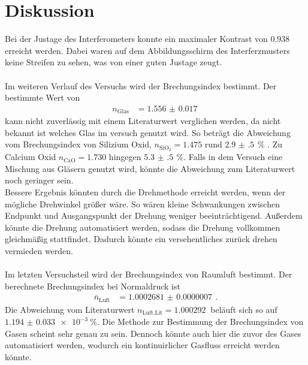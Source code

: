 \newpage
\section{Diskussion}
\label{sec:diskussion}
Bei der Justage des Interferometers konnte ein maximaler Kontrast von $0.938$ erreicht werden.
Dabei waren auf dem Abbildungsschirm des Interferzmusters keine Streifen zu sehen, was von einer guten Justage zeugt.\\\\
Im weiteren Verlauf des Versuchs wird der Brechungsindex bestimmt.
Der bestimmte Wert von 
\begin{align}
    n_\text{Glas} &= \SI{1.556(17)}{}
\end{align}
kann nicht zuverlässig mit einem Literaturwert verglichen werden, da nicht bekannt ist welches Glas im versuch genutzt wird.
So beträgt die Abweichung vom Brechungsindex von Silizium Oxid, $n_{\text{SiO}_2} = 1.475$ rund $\SI{2.9(5)}{} \,\%$ \cite{Teschner2019}.
Zu Calcium Oxid $n_\text{CaO} = 1.730$ hingegen $\SI{5.3(5)}{}\,\%$.
Falls in dem Versuch eine Mischung aus Gläsern genutzt wird, könnte die Abweichung zum Literaturwert noch geringer sein.\\
Bessere Ergebnis könnten durch die Drehmethode erreicht werden, wenn der mögliche Drehwinkel größer wäre.
So wären kleine Schwankungen zwischen Endpunkt und Ausgangspunkt der Drehung weniger beeinträchtigend.
Außerdem könnte die Drehung automatisiert werden, sodass die Drehung vollkommen gleichmäßig stattfindet.
Dadurch könnte ein versehentliches zurück drehen vermieden werden.\\\\
Im letzten Versuchsteil wird der Brechungsindex von Raumluft bestimmt.
Der berechnete Brechungsindex bei Normaldruck ist
\begin{align*}
    \bar{n}_\text{Luft} &= \SI{1.0002681(07)}{}\,.
\end{align*}
Die Abweichung vom Literaturwert ${n_\text{Luft,Lit} = \SI{1.000292}{}}$ \cite{Dem2} beläuft sich so auf ${\SI{1.194(33)e-3}{\percent}}$.
Die Methode zur Bestimmung der Brechungsindex von Gasen scheint sehr genau zu sein.
Dennoch könnte auch hier die zuvor des Gases automatisiert werden, wodurch ein kontinuirlicher Gasfluss erreicht werden könnte.